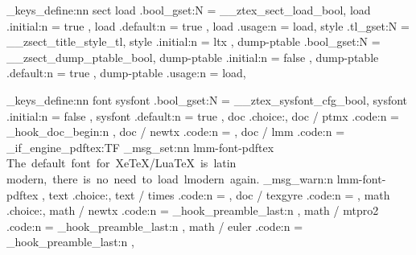 \ztex_keys_define:nn { sect }{
  load          .bool_gset:N  = \g__ztex_sect_load_bool,
  load          .initial:n    = { true },
  load          .default:n    = { true },
  load          .usage:n      = load,
  style         .tl_gset:N    = \g__zsect_title_style_tl,
  style         .initial:n    = { ltx },
  dump-ptable   .bool_gset:N  = \g__zsect_dump_ptable_bool,
  dump-ptable   .initial:n    = { false },
  dump-ptable   .default:n    = { true },
  dump-ptable   .usage:n      = load,
}


\ztex_keys_define:nn { font }{
  sysfont         .bool_gset:N  = \g__ztex_sysfont_cfg_bool,
  sysfont         .initial:n    = { false },
  sysfont         .default:n    = { true },
  doc             .choice:,
  doc / ptmx      .code:n       = {
    \RequirePackage{mathptmx}
    \RequirePackage{newtxtext}
    \ztex_hook_doc_begin:n
      {
        \let\pi\new@pi
        \let\jmath\new@jmath
        \let\amalg\new@amalg
        \let\coprod\new@coprod
      }
  },
  doc / newtx    .code:n       = {
    \RequirePackage{newtxtext}
    \RequirePackage{newtxmath}
  },
  doc / lmm       .code:n      = {
    \sys_if_engine_pdftex:TF 
      { 
        \RequirePackage{lmodern}
        \RequirePackage{fixcmex} 
      }{ 
        \ztex_msg_set:nn {lmm-font-pdftex}
          {
            The~default~font~for~XeTeX/LuaTeX~is~latin~
            modern,~there~is~no~need~to~load~lmodern~again.
          }
        \ztex_msg_warn:n {lmm-font-pdftex} 
      }
  },
  text            .choice:,
  text / times    .code:n       = { \RequirePackage{newtxtext} },
  doc / texgyre   .code:n       = {  },  %
  math            .choice:,
  math / newtx    .code:n       = {
    \ztex_hook_preamble_last:n { \RequirePackage{newtxmath} } 
  },
  math / mtpro2   .code:n       = { 
    \ztex_hook_preamble_last:n { 
    } 
  },
  math / euler    .code:n       = { 
    \ztex_hook_preamble_last:n {  } 
  },
}
